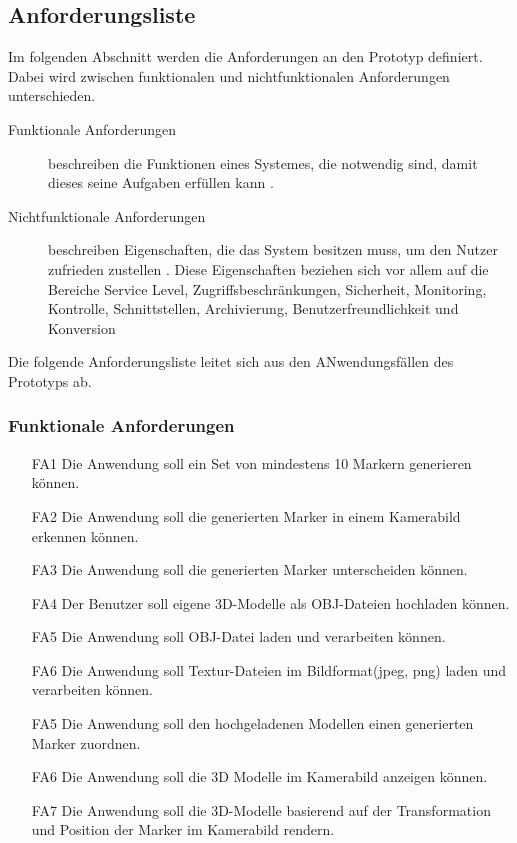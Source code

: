\subsection{Anforderungsliste}
Im folgenden Abschnitt werden die Anforderungen an den Prototyp definiert. Dabei wird zwischen funktionalen und nichtfunktionalen Anforderungen unterschieden. \\
\begin{description}
\item[Funktionale Anforderungen] 
beschreiben die Funktionen eines Systemes, die notwendig sind, damit dieses seine Aufgaben erfüllen kann \citep[S. 223]{robertson:requirements-process}.
\item[Nichtfunktionale Anforderungen] 
beschreiben Eigenschaften, die das System besitzen muss, um den Nutzer zufrieden zustellen \citep[S. 10]{robertson:requirements-process}. Diese Eigenschaften beziehen sich vor allem auf die Bereiche Service Level, Zugriffsbeschränkungen, Sicherheit, Monitoring, Kontrolle, Schnittstellen, Archivierung, Benutzerfreundlichkeit und Konversion \citep[S. 139]{boehm:systementwicklung}
\end{description}
Die folgende Anforderungsliste leitet sich aus den ANwendungsfällen des Prototyps ab.

 
\subsubsection{Funktionale Anforderungen}
\begin{itemize}
\item[FA1] Die Anwendung soll ein Set von mindestens 10 Markern generieren können.
\item[FA2] Die Anwendung soll die generierten Marker in einem Kamerabild erkennen können.
\item[FA3] Die Anwendung soll die generierten Marker unterscheiden können.
\item[FA4] Der Benutzer soll eigene 3D-Modelle als OBJ-Dateien hochladen können.
\item[FA5] Die Anwendung soll OBJ-Datei laden und verarbeiten können.
\item[FA6] Die Anwendung soll Textur-Dateien im Bildformat(jpeg, png) laden und verarbeiten können.
\item[FA5] Die Anwendung soll den hochgeladenen Modellen einen generierten Marker zuordnen.
\item[FA6] Die Anwendung soll die 3D Modelle im Kamerabild anzeigen können.
\item[FA7] Die Anwendung soll die 3D-Modelle basierend auf der Transformation und Position der Marker im Kamerabild rendern.
\end{itemize}

